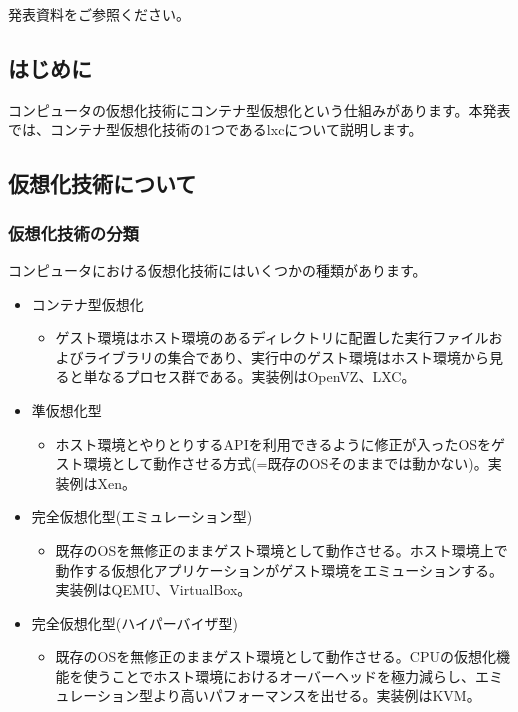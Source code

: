 \documentclass[mingoth,a4paper]{jsarticle}
\begin{document}

発表資料をご参照ください。



\subsection{はじめに}

コンピュータの仮想化技術にコンテナ型仮想化という仕組みがあります。本発表では、コンテナ型仮想化技術の1つであるlxcについて説明します。

\subsection{仮想化技術について}

\subsubsection{仮想化技術の分類}

コンピュータにおける仮想化技術にはいくつかの種類があります。

\begin{itemize}
  \item コンテナ型仮想化
  \begin{itemize}
  \item ゲスト環境はホスト環境のあるディレクトリに配置した実行ファイルおよびライブラリの集合であり、実行中のゲスト環境はホスト環境から見ると単なるプロセス群である。実装例はOpenVZ、LXC。
  \end{itemize}
  \item 準仮想化型
  \begin{itemize}
  \item ホスト環境とやりとりするAPIを利用できるように修正が入ったOSをゲスト環境として動作させる方式(=既存のOSそのままでは動かない)。実装例はXen。
  \end{itemize}
  \item 完全仮想化型(エミュレーション型)
  \begin{itemize}
  \item 既存のOSを無修正のままゲスト環境として動作させる。ホスト環境上で動作する仮想化アプリケーションがゲスト環境をエミューションする。実装例はQEMU、VirtualBox。
  \end{itemize}
\item 完全仮想化型(ハイパーバイザ型)
  \begin{itemize}
  \item 既存のOSを無修正のままゲスト環境として動作させる。CPUの仮想化機能を使うことでホスト環境におけるオーバーヘッドを極力減らし、エミュレーション型より高いパフォーマンスを出せる。実装例はKVM。
  \end{itemize}
\end{itemize}
\end{document}
